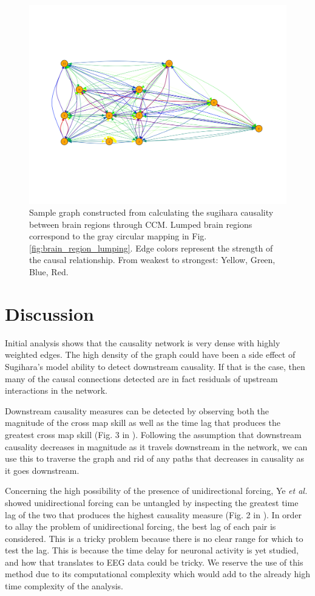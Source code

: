 \documentclass[journal,12pt,onecolumn,draftclsnofoot]{IEEEtran}  %
\begin{document}
\begin{figure}
  \centering
  \includegraphics[width=0.95\linewidth]{figures/sample_graph.pdf}
  \caption{Sample graph constructed from calculating the sugihara causality between brain regions through CCM. Lumped brain regions correspond to the gray circular mapping in Fig. \ref{fig:brain_region_lumping}. Edge colors represent the strength of the causal relationship. From weakest to strongest: Yellow, Green, Blue, Red.}
  \label{fig:sample_graph}
\end{figure}


\section{Discussion}

Initial analysis shows that the causality network is very dense with highly weighted edges. The high density of the graph could have been a side effect of Sugihara's model ability to detect downstream causality. If that is the case, then many of the causal connections detected are in fact residuals of upstream interactions in the network.

Downstream causality measures can be detected by observing both the magnitude of the cross map skill as well as the time lag that produces the greatest cross map skill (Fig. 3 in \cite{Ye2015}). Following the assumption that downstream causality decreases in magnitude as it travels downstream in the network, we can use this to traverse the graph and rid of any paths that decreases in causality as it goes downstream.

Concerning the high possibility of the presence of unidirectional forcing, Ye \textit{et al.} showed unidirectional forcing can be untangled by inspecting the greatest time lag of the two that produces the highest causality measure (Fig. 2 in \cite{Ye2015}). In order to allay the problem of unidirectional forcing, the best lag of each pair is considered. This is a tricky problem because there is no clear range for which to test the lag. This is because the time delay for neuronal activity is yet studied, and how that translates to EEG data could be tricky. We reserve the use of this method due to its computational complexity which would add to the already high time complexity of the analysis.
\end{document}
